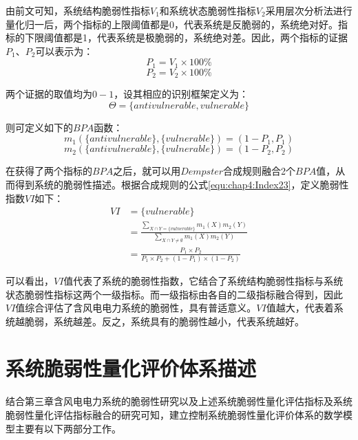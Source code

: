 由前文可知，系统结构脆弱性指标$V_1$和系统状态脆弱性指标$V_2$采用层次分析法进行量化归一后，两个指标的上限阈值都是0，代表系统是反脆弱的，系统绝对好。指标的下限阈值都是1，代表系统是极脆弱的，系统绝对差。因此，两个指标的证据$P_1$、$P_2$可以表示为：
\begin{equation}\label{equ:chap4:Index26}
P_1=V_1\times 100\%
\end{equation}
\begin{equation}\label{equ:chap4:Index27}
P_2=V_2\times 100\%
\end{equation}

两个证据的取值均为$0-1$，设其相应的识别框架定义为：
\begin{equation}\label{equ:chap4:Index28}
\Theta = \{antivulnerable,vulnerable\}
\end{equation}

则可定义如下的$BPA$函数：
\begin{equation}\label{equ:chap4:Index29}
m_1(\{antivulnerable\},\{vulnerable\})=(1-P_1,P_1)
\end{equation}
\begin{equation}\label{equ:chap4:Index30}
m_2(\{antivulnerable\},\{vulnerable\})=(1-P_2,P_2)
\end{equation}

在获得了两个指标的$BPA$之后，就可以用$Dempster$合成规则融合2个$BPA$值，从而得到系统的脆弱性描述。根据合成规则的公式\ref{equ:chap4:Index23}，定义脆弱性指数$VI$如下：
\begin{equation}\label{equ:chap4:Index31}
\begin{split}
   VI& =\{vulnerable\} \\
     & =\displaystyle\frac{\sum_{X\cap Y=\{vulnerable\}}m_1(X)m_2(Y)}{\sum_{X\cap Y\neq {\emptyset}}m_1(X)m_2(Y)} \\
     & =\frac{P_1 \times P_2}{P_1 \times P_2+(1-P_1) \times (1-P_2)}
\end{split}
\end{equation}

可以看出，$VI$值代表了系统的脆弱性指数，它结合了系统结构脆弱性指标与系统状态脆弱性指标这两个一级指标。而一级指标由各自的二级指标融合得到，因此$VI$值综合评估了含风电电力系统的脆弱性，具有普适意义。$VI$值越大，代表着系统越脆弱，系统越差。反之，系统具有的脆弱性越小，代表系统越好。

\section{系统脆弱性量化评价体系描述}
\label{sec:systemQuan}
结合第三章含风电电力系统的脆弱性研究以及上述系统脆弱性量化评估指标及系统脆弱性量化评估指标融合的研究可知，建立控制系统脆弱性量化评价体系的数学模型主要有以下两部分工作。

